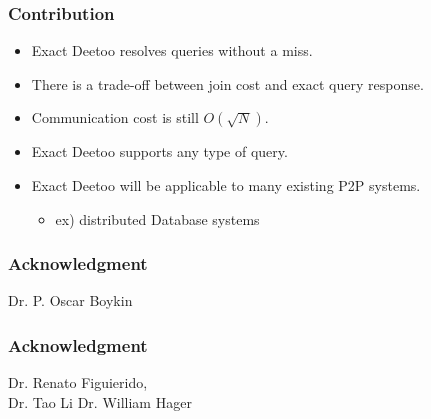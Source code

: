 \documentclass[red]{beamer}
\begin{document}
\begin{frame}
\frametitle{Contribution}
\begin{itemize}
\item Exact Deetoo resolves queries without a miss.
\item There is a trade-off between join cost and exact query response.
\item Communication cost is still $O(\sqrt{N})$.
\item Exact Deetoo supports any type of query.
\item Exact Deetoo will be applicable to many existing P2P systems.
\begin{itemize}
\item ex) distributed Database systems
\end{itemize}
\end{itemize}
\end{frame}

\begin{frame}
\frametitle{Acknowledgment}
\begin{center}
\huge Dr. P. Oscar Boykin
\end{center}
\end{frame}

\begin{frame}
\frametitle{Acknowledgment}
\begin{center}
\huge Dr. Renato Figuierido, \\
Dr. Tao Li
Dr. William Hager
\end{center}
\end{frame}
\end{document}
